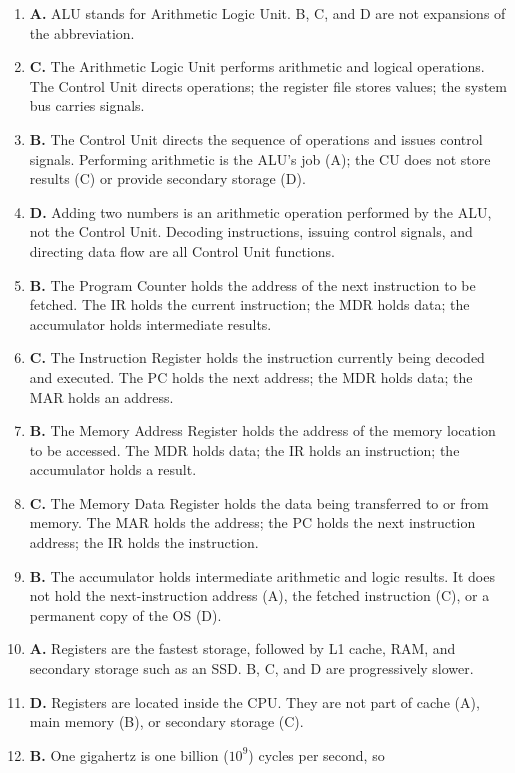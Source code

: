 \begin{enumerate}[label=\textbf{Q\arabic*.}, leftmargin=*]
\item \textbf{A.} ALU stands for Arithmetic Logic Unit. B, C, and D are not
  expansions of the abbreviation.
\item \textbf{C.} The Arithmetic Logic Unit performs arithmetic and logical
  operations. The Control Unit directs operations; the register file stores
  values; the system bus carries signals.
\item \textbf{B.} The Control Unit directs the sequence of operations and
  issues control signals. Performing arithmetic is the ALU's job (A); the
  CU does not store results (C) or provide secondary storage (D).
\item \textbf{D.} Adding two numbers is an arithmetic operation performed by
  the ALU, not the Control Unit. Decoding instructions, issuing control
  signals, and directing data flow are all Control Unit functions.
\item \textbf{B.} The Program Counter holds the address of the next
  instruction to be fetched. The IR holds the current instruction; the MDR
  holds data; the accumulator holds intermediate results.
\item \textbf{C.} The Instruction Register holds the instruction currently
  being decoded and executed. The PC holds the next address; the MDR holds
  data; the MAR holds an address.
\item \textbf{B.} The Memory Address Register holds the address of the memory
  location to be accessed. The MDR holds data; the IR holds an instruction;
  the accumulator holds a result.
\item \textbf{C.} The Memory Data Register holds the data being transferred
  to or from memory. The MAR holds the address; the PC holds the next
  instruction address; the IR holds the instruction.
\item \textbf{B.} The accumulator holds intermediate arithmetic and logic
  results. It does not hold the next-instruction address (A), the fetched
  instruction (C), or a permanent copy of the OS (D).
\item \textbf{A.} Registers are the fastest storage, followed by L1 cache,
  RAM, and secondary storage such as an SSD. B, C, and D are progressively
  slower.
\item \textbf{D.} Registers are located inside the CPU. They are not part of
  cache (A), main memory (B), or secondary storage (C).
\item \textbf{B.} One gigahertz is one billion ($10^9$) cycles per second, so

\end{enumerate}
